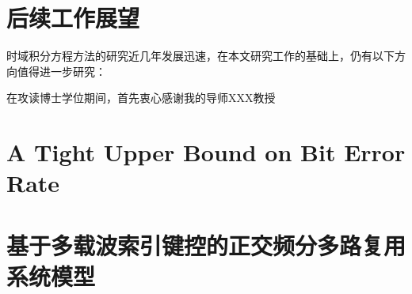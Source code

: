 \documentclass[bachelor]{thesis-uestc}
\begin{document}
	\section{后续工作展望}
	时域积分方程方法的研究近几年发展迅速，在本文研究工作的基础上，仍有以下方向值得进一步研究：
	
	\thesisacknowledgement
	在攻读博士学位期间，首先衷心感谢我的导师XXX教授
	
	
	
	
	\thesisappendix
	
	
	
	\thesistranslationoriginal
	\section{A Tight Upper Bound on Bit Error Rate}
	
	
	\thesistranslationchinese
	
	\section{基于多载波索引键控的正交频分多路复用系统模型}
	
\end{document}
